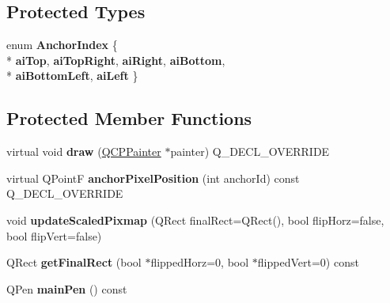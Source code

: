 \subsection*{Protected Types}
\begin{DoxyCompactItemize}
\item 
enum {\bfseries Anchor\+Index} \{ \\*
{\bfseries ai\+Top}, 
{\bfseries ai\+Top\+Right}, 
{\bfseries ai\+Right}, 
{\bfseries ai\+Bottom}, 
\\*
{\bfseries ai\+Bottom\+Left}, 
{\bfseries ai\+Left}
 \}\hypertarget{classQCPItemPixmap_a0ea7f65edb7395e02de521915f221174}{}\label{classQCPItemPixmap_a0ea7f65edb7395e02de521915f221174}

\end{DoxyCompactItemize}
\subsection*{Protected Member Functions}
\begin{DoxyCompactItemize}
\item 
virtual void {\bfseries draw} (\hyperlink{classQCPPainter}{Q\+C\+P\+Painter} $\ast$painter) Q\+\_\+\+D\+E\+C\+L\+\_\+\+O\+V\+E\+R\+R\+I\+DE\hypertarget{classQCPItemPixmap_a9538a7d37fe20a4ff4bb2cb5bbbf2b48}{}\label{classQCPItemPixmap_a9538a7d37fe20a4ff4bb2cb5bbbf2b48}

\item 
virtual Q\+PointF {\bfseries anchor\+Pixel\+Position} (int anchor\+Id) const Q\+\_\+\+D\+E\+C\+L\+\_\+\+O\+V\+E\+R\+R\+I\+DE\hypertarget{classQCPItemPixmap_a5803d8e173bc4d48619fc43701db32e5}{}\label{classQCPItemPixmap_a5803d8e173bc4d48619fc43701db32e5}

\item 
void {\bfseries update\+Scaled\+Pixmap} (Q\+Rect final\+Rect=Q\+Rect(), bool flip\+Horz=false, bool flip\+Vert=false)\hypertarget{classQCPItemPixmap_a8bced3027b326b290726cd1979c7cfc6}{}\label{classQCPItemPixmap_a8bced3027b326b290726cd1979c7cfc6}

\item 
Q\+Rect {\bfseries get\+Final\+Rect} (bool $\ast$flipped\+Horz=0, bool $\ast$flipped\+Vert=0) const \hypertarget{classQCPItemPixmap_a245ef0c626cab7096a810442f2f6a2d9}{}\label{classQCPItemPixmap_a245ef0c626cab7096a810442f2f6a2d9}

\item 
Q\+Pen {\bfseries main\+Pen} () const \hypertarget{classQCPItemPixmap_af21085516585c475dc9d839e7f377233}{}\label{classQCPItemPixmap_af21085516585c475dc9d839e7f377233}

\end{DoxyCompactItemize}
